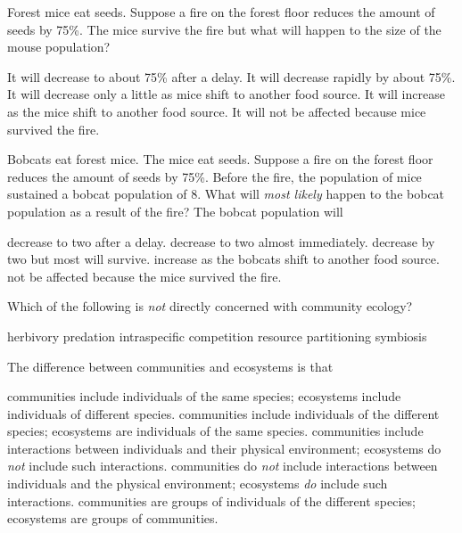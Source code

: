 \question
Forest mice eat seeds. Suppose a fire on the forest floor reduces the amount of seeds by 75\%. The mice survive the fire but what will happen to the size of the mouse population?

\begin{choices}
	\correctchoice It will decrease to about 75\% after a delay. %
	\choice It will decrease rapidly by about 75\%. %
	\choice It will decrease only a little as mice shift to another food source. %
	\choice It will increase as the mice shift to another food source. %
	\choice It will not be affected because mice survived the fire. %
\end{choices}



\question
Bobcats eat forest mice. The mice eat seeds. Suppose a fire on the forest floor reduces the amount of seeds by 75\%.  Before the fire, the population of mice sustained a bobcat population of 8. What will \emph{most likely} happen to the bobcat population as a result of the fire? The bobcat population will

\begin{choices}
	\correctchoice decrease to two after a delay. %
	\choice decrease to two almost immediately. %
	\choice decrease by two but most will survive. %
	\choice increase as the bobcats shift to another food source. %
	\choice not be affected because the mice survived the fire. %
\end{choices}

\question
Which of the following is \emph{not} directly concerned with community ecology?

\begin{choices}
	\choice herbivory%
	\choice predation%
	\correctchoice intraspecific competition%
	\choice resource partitioning%
	\choice symbiosis%
\end{choices}

\question
The difference between communities and ecosystems is that

\begin{choices}
	\choice communities include individuals of the same species; ecosystems include individuals of different species.%
	\choice communities include individuals of the different species; ecosystems are individuals of the same species.%
	\choice communities include interactions between individuals and their physical environment; ecosystems do \emph{not} include such interactions.%
	\correctchoice communities do \emph{not} include interactions between individuals and the physical environment; ecosystems \emph{do} include such interactions.%
	\choice communities are groups of individuals of the different species; ecosystems are groups of communities.%
\end{choices}

